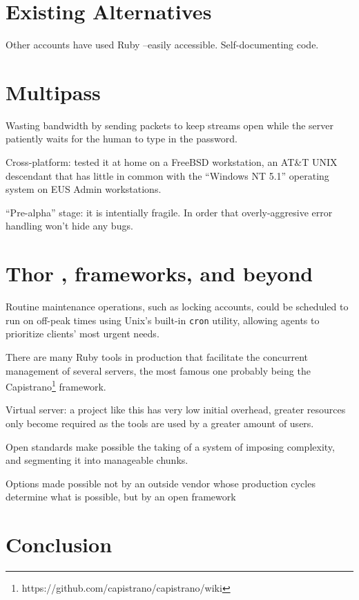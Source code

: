 \documentclass[12pt]{article}
\begin{document}
\section{Existing Alternatives}

Other accounts have used 
Ruby --easily accessible.  Self-documenting code.



\section{Multipass}

Wasting bandwidth by sending packets to keep streams open while the
server patiently waits for the human to type in the password.   


Cross-platform:  tested it at home on a FreeBSD workstation, an  AT\&T
UNIX descendant that has little in common with the ``Windows NT 5.1''
operating system on EUS Admin workstations.

``Pre-alpha'' stage:  it is intentially fragile.  In order that
overly-aggresive error handling won't hide any bugs.

\section{Thor , frameworks, and beyond}

Routine maintenance operations, such as locking accounts, could be
scheduled to run on off-peak times using Unix's built-in \texttt{cron}
utility, allowing agents to prioritize clients' most urgent needs. 


There are many Ruby tools in production that facilitate the concurrent
management of several servers, the most famous one probably being the
Capistrano\footnote{https://github.com/capistrano/capistrano/wiki} framework.

Virtual server: a project like this has very low initial overhead,
greater resources only become required as the tools are used by a
greater amount of users.  


Open standards make possible the taking of a system of imposing
complexity, and segmenting it into manageable chunks.



Options made possible not by an outside vendor whose production cycles
determine what is possible, but by an open framework 


\section{Conclusion}
\end{document}
